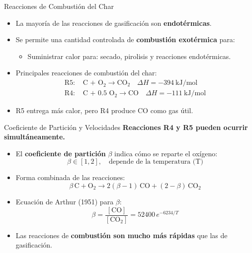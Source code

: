 \documentclass[../../main.tex]{subfiles}
\begin{document}
\begin{frame}{Reacciones de Combustión del Char}
\small
\begin{itemize}
  \item La mayoría de las reacciones de gasificación son \textbf{endotérmicas}.
  \item Se permite una cantidad controlada de \textbf{combustión exotérmica} para:
  \begin{itemize}
    \item Suministrar calor para: secado, pirolisis y reacciones endotérmicas.
  \end{itemize}
  \item Principales reacciones de combustión del char:
  \begin{align*}
  \text{R5: } & \text{C + O}_2 \rightarrow \text{CO}_2 \quad \Delta H = -394\ \text{kJ/mol} \\
  \text{R4: } & \text{C + 0.5 O}_2 \rightarrow \text{CO} \quad \Delta H = -111\ \text{kJ/mol}
  \end{align*}
  \item R5 entrega más calor, pero R4 produce CO como gas útil.
\end{itemize}
\end{frame}

\begin{frame}{Coeficiente de Partición y Velocidades}
\small
\textbf{Reacciones R4 y R5 pueden ocurrir simultáneamente.}

\begin{itemize}
  \item El \textbf{coeficiente de partición} $\beta$ indica cómo se reparte el oxígeno:
  \[
  \beta \in [1, 2], \quad \text{depende de la temperatura (T)}
  \]
  \item Forma combinada de las reacciones:
  \[
  \beta\,\text{C} + \text{O}_2 \rightarrow 2(\beta-1)\,\text{CO} + (2-\beta)\,\text{CO}_2
  \]
  \item Ecuación de Arthur (1951) para $\beta$:
  \[
  \beta = \frac{[\text{CO}]}{[\text{CO}_2]} = 52400\,e^{-6234/T}
  \]
  \item Las reacciones de \textbf{combustión son mucho más rápidas} que las de gasificación.
\end{itemize}
\end{frame}
\end{document}
